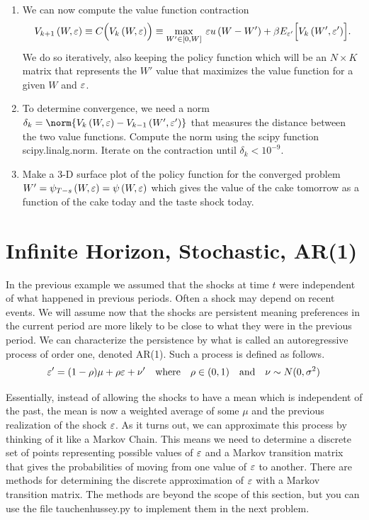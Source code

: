 \begin{problem}
\begin{enumerate}
   \item We can now compute the value function contraction 
     \begin{equation}\label{EqContractStochiid}
      V_{k+1}\left(W,\varepsilon\right) \equiv C\Bigl(V_k\left(W,\varepsilon\right)\Bigr) \equiv \max_{W'\in[0,W]}\: \varepsilon u\left(W-W'\right) + \beta E_{\varepsilon'}\Bigl[V_k\left(W',\varepsilon'\right)\Bigr].
      \end{equation}
        We do so iteratively, also keeping the policy function which will be an $N\times K$ matrix that represents the $W'$ value that maximizes the value function for a given $W$ and $\varepsilon$.

   \item To determine convergence, we need a norm $\delta_k = \norm{V_k\left(W,\ve\right) - V_{k-1}\left(W',\ve'\right)}$ that measures the distance between the two value functions.  Compute the norm using the scipy function scipy.linalg.norm.  Iterate on the contraction until $\delta_k < 10^{-9}$.
       
   \item Make a 3-D surface plot of the policy function for the converged problem $W' = \psi_{T-s}\left(W,\varepsilon\right) = \psi\left(W,\varepsilon\right)$ which gives the value of the cake tomorrow as a function of the cake today  and the taste shock today.

\end{enumerate}
\end{problem}

\newpage
\section{Infinite Horizon, Stochastic, AR(1)}\label{SecRecProbInfinHorStochAR1}

In the previous example we assumed that the shocks at time $t$ were independent of what happened in previous periods.  Often a shock may depend on recent events.  We will assume now that the shocks are persistent meaning preferences in the current period are more likely to be close to what they were in the previous period.  We can characterize the persistence by what is called an autoregressive process of order one, denoted AR(1).  Such a process is defined as follows.
\begin{equation}\label{EqAR1shock}
   \varepsilon' = (1-\rho)\mu + \rho\varepsilon + \nu' \quad\text{where}\quad \rho\in(0,1) \quad\text{and}\quad \nu\sim N(0,\sigma^2)
\end{equation}

Essentially, instead of allowing the shocks to have a mean which is independent of the past, the mean is now a weighted average of some $\mu$ and the previous realization of the shock $\varepsilon$.  As it turns out, we can approximate this process by thinking of it like a Markov Chain. This means we need to determine a discrete set of points representing possible values of $\varepsilon$ and a Markov transition matrix that gives the probabilities of moving from one value of $\varepsilon$ to another.  There are methods for determining the discrete approximation of $\varepsilon$ with a Markov transition matrix.  The methods are beyond the scope of this section, but you can use the file tauchenhussey.py to implement them in the next problem.

